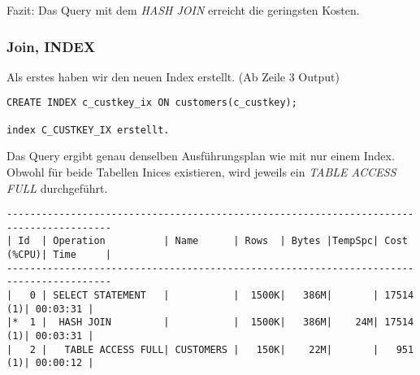 \documentclass[11pt,a4paper,parskip=half]{scrartcl}
\begin{document}
Fazit: Das Query mit dem \emph{HASH JOIN} erreicht die geringsten Kosten.

\subsubsection{Join, INDEX}
Als erstes haben wir den neuen Index erstellt. (Ab Zeile 3 Output)
\begin{lstlisting}
CREATE INDEX c_custkey_ix ON customers(c_custkey);

index C_CUSTKEY_IX erstellt.
\end{lstlisting}

Das Query ergibt genau denselben Ausführungsplan wie mit nur einem Index. Obwohl für beide Tabellen Inices existieren, wird jeweils ein \emph{TABLE ACCESS FULL} durchgeführt.
\begin{lstlisting}
----------------------------------------------------------------------------------------                                                                                                                                                                                                                     
| Id  | Operation          | Name      | Rows  | Bytes |TempSpc| Cost (%CPU)| Time     |                                                                                                                                                                                                                     
----------------------------------------------------------------------------------------                                                                                                                                                                                                                     
|   0 | SELECT STATEMENT   |           |  1500K|   386M|       | 17514   (1)| 00:03:31 |                                                                                                                                                                                                                     
|*  1 |  HASH JOIN         |           |  1500K|   386M|    24M| 17514   (1)| 00:03:31 |                                                                                                                                                                                                                     
|   2 |   TABLE ACCESS FULL| CUSTOMERS |   150K|    22M|       |   951   (1)| 00:00:12 |                                                                                                                                                                                                                     

\end{lstlisting}
\end{document}
